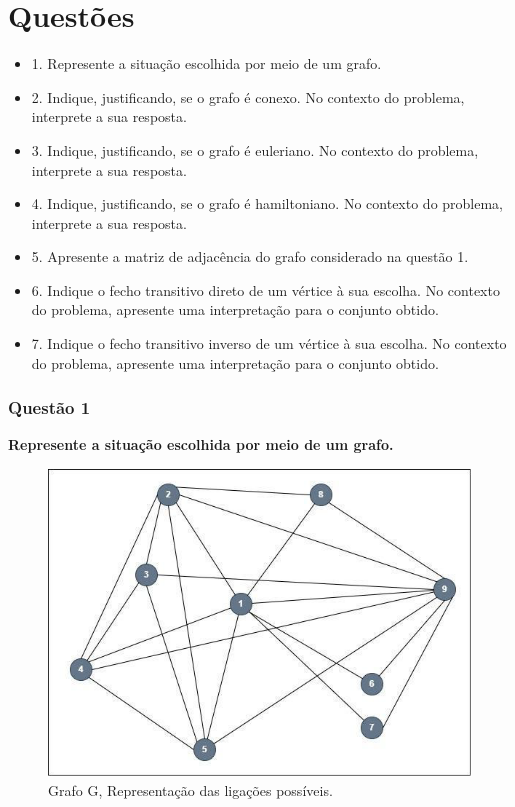 \documentclass{report}
\begin{document}
\chapter{Questões}
\begin{itemize}
\item 1. Represente a situação escolhida por meio de um grafo.
\item 2. Indique, justificando, se o grafo é conexo.
No contexto do problema, interprete a sua resposta.
\item 3. Indique, justificando, se o grafo é euleriano.
No contexto do problema, interprete a sua resposta.
\item4. Indique, justificando, se o grafo é hamiltoniano.
No contexto do problema, interprete a sua resposta.
\item 5. Apresente a matriz de adjacência do grafo considerado na questão 1.
\item 6. Indique o fecho transitivo direto de um vértice à sua escolha.
No contexto do problema, apresente uma interpretação para o conjunto obtido.
\item 7. Indique o fecho transitivo inverso de um vértice à sua escolha.
No contexto do problema, apresente uma interpretação para o conjunto obtido.
\end{itemize}

\newpage
\subsection{Questão 1} %
\textbf{Represente a situação escolhida por meio de um grafo.} 

\begin{figure}[h]
    \centering
    \includegraphics[width=12cm]{Imagem_2_Geral.png}
    \caption{Grafo G, Representação das ligações possíveis.}
    \label{fig2}
\end{figure}
\end{document}
